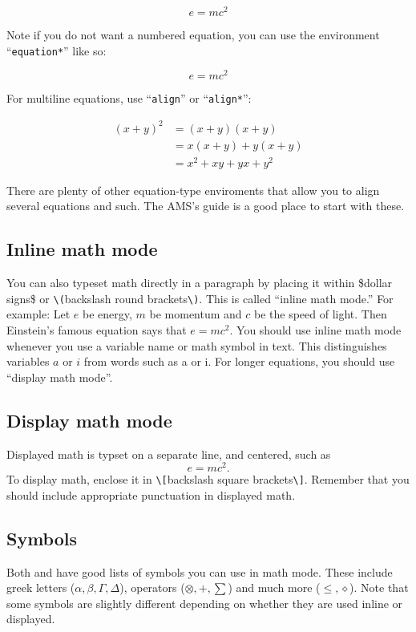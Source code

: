 \documentclass[11pt,oneside,draft]{amsart}
\numberwithin{equation}{section} %
\numberwithin{figure}{section} %
\theoremstyle{plain} %
\theoremstyle{definition} %
\theoremstyle{remark} %
\begin{document}
\begin{equation}\label{eq1}  e = mc^2
\end{equation}

Note if you do not want a numbered equation, you can use the
environment ``\texttt{equation*}''
 like so:

\begin{equation*}
e=mc^2
\end{equation*}

For multiline equations, use ``\texttt{align}'' or
``\texttt{align*}'':

\begin{align}
  (x + y)^2 & = (x+y) (x+y) \label{eq2}\\
  & = x(x+y) + y(x+y) \nonumber\\
  & = x^2 + xy + yx + y^2 \label{eq3}
\end{align}

There are plenty of other equation-type enviroments that allow you to
align several equations and such. The AMS's guide \cite{amsshort} is a
good place to start with these.


\subsection{Inline math mode}
You can also typeset math directly in a paragraph by placing it within
\$dollar signs\$ or \verb|\(|backslash round brackets\verb|\)|.  This is called ``inline math mode.''  For example: Let $e$
be energy, $m$ be momentum and $c$ be the speed of light.  Then
Einstein's famous equation says that \(e=mc^2\).  You should use inline
math mode whenever you use a variable name or math symbol in text.
This distinguishes variables $a$ or $i$ from words such as a or i.
For longer equations, you should use ``display math mode''.

\subsection{Display math mode}
Displayed math is typset on a separate line, and centered, such as
\[
e = mc^2.
\]
To display math, enclose it in \verb|\[|backslash square
brackets\verb|\]|.  Remember that you should include appropriate punctuation in
displayed math.

\subsection{Symbols}

Both \cite{notsoshort} and \cite{amsshort} have good lists of symbols
you can use in math mode.  These include greek letters ($\alpha,
\beta, \Gamma, \Delta$), operators ($\otimes, +, \sum$) and much more
($\leq, \diamond$).  Note that some symbols are slightly different
depending on whether they are used inline or displayed.
\end{document}
